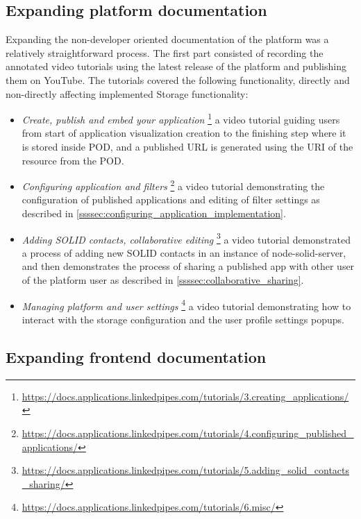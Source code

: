 \subsection{Expanding platform documentation}

Expanding the non-developer oriented documentation of the \lpa{} platform was a relatively straightforward process. The first part consisted of recording the annotated video tutorials using the latest release of the platform and publishing them on \lpa{} YouTube. The tutorials covered the following functionality, directly and non-directly affecting implemented Storage functionality:

\begin{itemize}
    \item \textit{Create, publish and embed your application} \footnote{\url{https://docs.applications.linkedpipes.com/tutorials/3.creating_applications/}} a video tutorial guiding users from start of application visualization creation to the finishing step where it is stored inside \solid{} POD, and a published URL is generated using the URI of the resource from the POD.
    \item \textit{Configuring application and filters} \footnote{\url{https://docs.applications.linkedpipes.com/tutorials/4.configuring_published_applications/}} a video tutorial demonstrating the configuration of published applications and editing of filter settings as described in \autoref{ssssec:configuring_application_implementation}.
    \item \textit{Adding SOLID contacts, collaborative editing} \footnote{\url{https://docs.applications.linkedpipes.com/tutorials/5.adding_solid_contacts_sharing/}} a video tutorial demonstrated a process of adding new SOLID contacts in an instance of node-solid-server, and then demonstrates the process of sharing a published app with other user of the platform user as described in \autoref{ssssec:collaborative_sharing}.
    \item \textit{Managing platform and user settings} \footnote{\url{https://docs.applications.linkedpipes.com/tutorials/6.misc/}} a video tutorial demonstrating how to interact with the storage configuration and the \solid{} user profile settings popups. 
\end{itemize} 

\subsection{Expanding frontend documentation}

